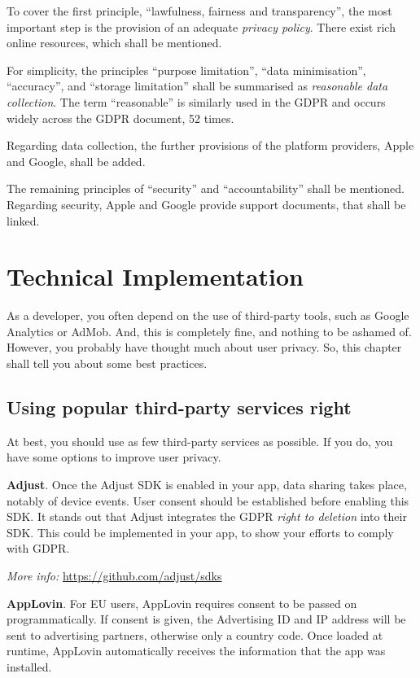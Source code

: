 \documentclass[
]{book}
\begin{document}
To cover the first principle, ``lawfulness, fairness and transparency'', the most important step is the provision of an adequate \emph{privacy policy}. There exist rich online resources, which shall be mentioned.

For simplicity, the principles ``purpose limitation'', ``data minimisation'', ``accuracy'', and ``storage limitation'' shall be summarised as \emph{reasonable data collection}. The term ``reasonable'' is similarly used in the GDPR and occurs widely across the GDPR document, 52 times.

Regarding data collection, the further provisions of the platform providers, Apple and Google, shall be added.

The remaining principles of ``security'' and ``accountability'' shall be mentioned. Regarding security, Apple and Google provide support documents, that shall be linked.

\hypertarget{technical-implementation}{%
\chapter{Technical Implementation}\label{technical-implementation}}

As a developer, you often depend on the use of third-party tools, such as Google Analytics or AdMob. And, this is completely fine, and nothing to be ashamed of. However, you probably have thought much about user privacy. So, this chapter shall tell you about some best practices.

\hypertarget{using-popular-third-party-services-right}{%
\section{Using popular third-party services right}\label{using-popular-third-party-services-right}}

At best, you should use as few third-party services as possible. If you do, you have some options to improve user privacy.

\textbf{Adjust}. Once the Adjust SDK is enabled in your app, data sharing takes place, notably of device events. User consent should be established before enabling this SDK. It stands out that Adjust integrates the GDPR \emph{right to deletion} into their SDK. This could be implemented in your app, to show your efforts to comply with GDPR.

\emph{More info:} \url{https://github.com/adjust/sdks}

\textbf{AppLovin}. For EU users, AppLovin requires consent to be passed on programmatically. If consent is given, the Advertising ID and IP address will be sent to advertising partners, otherwise only a country code. Once loaded at runtime, AppLovin automatically receives the information that the app was installed.
\end{document}
